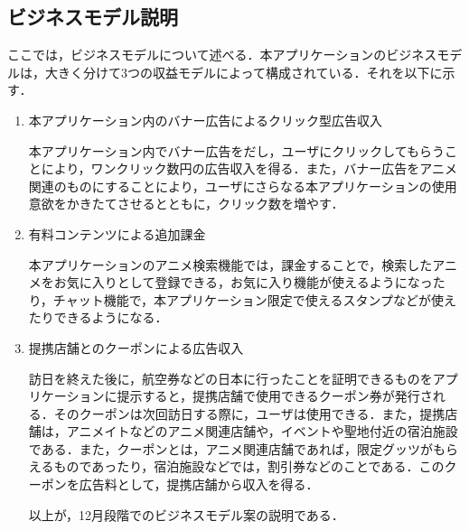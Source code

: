 \subsection{ビジネスモデル説明}
\par
 ここでは，ビジネスモデルについて述べる．本アプリケーションのビジネスモデルは，大きく分けて3つの収益モデルによって構成されている．それを以下に示す．
\begin{enumerate}
\item 本アプリケーション内のバナー広告によるクリック型広告収入
\par 
本アプリケーション内でバナー広告をだし，ユーザにクリックしてもらうことにより，ワンクリック数円の広告収入を得る．また，バナー広告をアニメ関連のものにすることにより，ユーザにさらなる本アプリケーションの使用意欲をかきたてさせるとともに，クリック数を増やす．
\item 有料コンテンツによる追加課金 
\par
 本アプリケーションのアニメ検索機能では，課金することで，検索したアニメをお気に入りとして登録できる，お気に入り機能が使えるようになったり，チャット機能で，本アプリケーション限定で使えるスタンプなどが使えたりできるようになる．
\item 提携店舗とのクーポンによる広告収入
\par
 訪日を終えた後に，航空券などの日本に行ったことを証明できるものをアプリケーションに提示すると，提携店舗で使用できるクーポン券が発行される．そのクーポンは次回訪日する際に，ユーザは使用できる．また，提携店舗は，アニメイトなどのアニメ関連店舗や，イベントや聖地付近の宿泊施設である．また，クーポンとは，アニメ関連店舗であれば，限定グッツがもらえるものであったり，宿泊施設などでは，割引券などのことである．このクーポンを広告料として，提携店舗から収入を得る．
\par
以上が，12月段階でのビジネスモデル案の説明である．
\end{enumerate}
